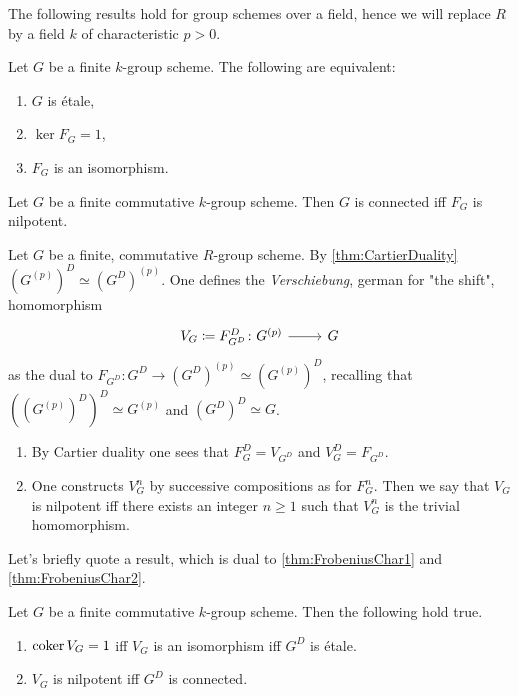 \noindent
The following results hold for group schemes over a field, hence we will replace
$R$ by a field $k$ of characteristic $p > 0$.
\begin{prop}[]\label{thm:FrobeniusChar1}
	Let $G$ be a finite $k$-group scheme.
	The following are equivalent:
\begin{enumerate}
	\item $G$ is étale,
	\item $\ker F_G = 1$,
	\item $F_G$ is an isomorphism.
\end{enumerate}
\end{prop}


\begin{prop}[]\label{thm:FrobeniusChar2}
	Let $G$ be a finite commutative $k$-group scheme.
	Then $G$ is connected iff $F_G$ is nilpotent.
\end{prop}


\begin{defn}[Verschiebung]
	Let $G$ be a finite, commutative $R$-group scheme.
	By \cref{thm:CartierDuality} $(G^{(p)})^D \simeq (G^D)^{(p)}$.
	One defines the \emph{Verschiebung}, german for "the shift", homomorphism
	\begin{equation*}
	\begin{tikzcd}[row sep = 0ex
		,/tikz/column 1/.append style={anchor=base east}
		,/tikz/column 2/.append style={anchor=base west}]
		V_G \coloneqq F^D_{G^D}\colon G^{(p)} \arrow[r, "", rightarrow] &
		G
	\end{tikzcd}
	\end{equation*} 
	as the dual to $F_{G^D}\colon G^D \to (G^D)^{(p)} \simeq (G^{(p)})^D$,
	recalling that $((G^{(p)})^D)^D \simeq G^{(p)}$ and $(G^D)^D \simeq G$.
\end{defn}


\begin{rem}[]\leavevmode\vspace{-.2\baselineskip}
\begin{enumerate}
\item By Cartier duality one sees that $F^D_G = V_{G^D}$ and
	$V^D_G = F_{G^D}$.
\item One constructs $V^n_G$ by successive compositions as for $F^n_G$.
	Then we say that $V_G$ is nilpotent iff there exists an integer $n \geq 1$
	such that $V^n_G$ is the trivial homomorphism.
\end{enumerate}
\end{rem}


\noindent
Let's briefly quote a result, which is dual to
\cref{thm:FrobeniusChar1} and \cref{thm:FrobeniusChar2}.
\begin{prop}[]
	Let $G$ be a finite commutative $k$-group scheme. Then the following hold true.
\begin{enumerate}
	\item $\operatorname{coker} V_G = 1$ iff $V_G$ is an isomorphism iff
		$G^D$ is étale.
	\item $V_G$ is nilpotent iff $G^D$ is connected.
\end{enumerate}
\end{prop}


